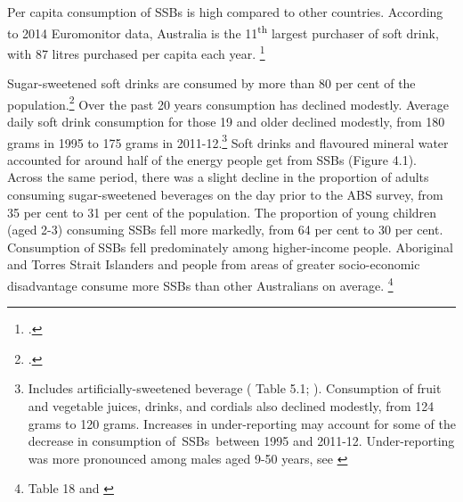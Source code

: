 \documentclass[embargoed]{grattan}
\begin{document}
Per capita consumption of SSBs is high compared to other countries.
According to 2014 Euromonitor data, Australia is the 11\textsuperscript{th} largest purchaser of soft drink, with 87 litres purchased per capita each year.%
\footcites{Silver2015IdBuyEmerging}{Popkin2016Sweeteningglobaldiet}

Sugar-sweetened soft drinks are consumed by more than 80 per cent of the population.\footcite{Levy2014QuenchingAustraliasthirst} Over the past 20 years consumption has declined modestly. Average daily soft drink consumption for those 19 and older declined modestly, from 180 grams in 1995 to 175 grams in 2011-12.\footnote{Includes artificially-sweetened beverage (\textcite{ABS20144364055007AustralianHealth} Table 5.1; \textcite[][Table~1]{ABS199948040NationalNutrition}). Consumption of fruit and vegetable juices, drinks, and cordials also declined modestly, from 124 grams to 120 grams. Increases in under-reporting may account for some of the decrease in consumption of~SSBs~between 1995 and 2011-12. Under-reporting was more pronounced among males aged 9-50 years, see \textcite{ABS20144364055007AustralianHealth}} %
\CenturyFootnote
Soft drinks and flavoured mineral water accounted for around half of the energy people get from SSBs (Figure 4.1).
Across the same period, there was a slight decline in the proportion of adults consuming sugar-sweetened beverages on the day prior to the ABS survey, from 35 per cent to 31 per cent of the population.
The proportion of young children (aged 2-3) consuming SSBs fell more markedly, from 64 per cent to 30 per cent.
Consumption of SSBs fell predominately among higher-income people.
Aboriginal and Torres Strait Islanders and people from areas of greater socio-economic disadvantage consume more SSBs than other Australians on average.%
\footnote{\textcite{ABS20144364055007AustralianHealth} Table 18 and \textcite{ABS199948040NationalNutrition}}
\end{document}

